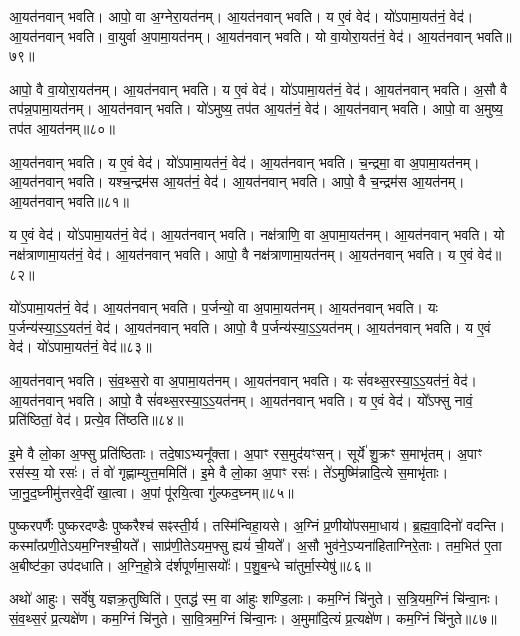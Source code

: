 आ॒यत॑नवान्‌ भवति। आपो॒ वा अ॒ग्नेरा॒यत॑नम्। 
आ॒यत॑नवान्‌ भवति। य ए॒वं वेद॑। 
यो॑ऽपामा॒यत॑नं॒ वेद॑। आ॒यत॑नवान्‌ भवति। 
वा॒युर्वा अ॒पामा॒यत॑नम्। आ॒यत॑नवान्‌ भवति। 
यो वा॒योरा॒यत॑नं॒ वेद॑। आ॒यत॑नवान्‌ भवति॥७९॥


आपो॒ वै वा॒योरा॒यत॑नम्। आ॒यत॑नवान्‌ भवति। 
य ए॒वं वेद॑। यो॑ऽपामा॒यत॑नं॒ वेद॑। 
आ॒यत॑नवान्‌ भवति। अ॒सौ वै तप॑न्न॒पा\-मा॒यत॑नम्। 
आ॒यत॑नवान्‌ भवति। यो॑ऽमुष्य॒ तप॑त आ॒यत॑नं॒ वेद॑। 
आ॒यत॑नवान्‌ भवति। आपो॒ वा अ॒मुष्य॒ तप॑त आ॒यत॑नम्॥८०॥


आ॒यत॑नवान्‌ भवति। य ए॒वं वेद॑। 
यो॑ऽपामा॒यत॑नं॒ वेद॑। आ॒यत॑नवान्‌ भवति। 
च॒न्द्रमा॒ वा अ॒पामा॒यत॑नम्। आ॒यत॑नवान्‌ भवति। 
यश्च॒न्द्रम॑स आ॒यत॑नं॒ वेद॑। आ॒यत॑नवान्‌ भवति। 
आपो॒ वै च॒न्द्रम॑स आ॒यत॑नम्। आ॒यत॑नवान्‌ भवति॥८१॥


य ए॒वं वेद॑। यो॑ऽपामा॒यत॑नं॒ वेद॑। 
आ॒यत॑नवान्‌ भवति। नक्ष॑त्राणि॒ वा अ॒पामा॒यत॑नम्। 
आ॒यत॑नवान्‌ भवति। यो नक्ष॑त्राणामा॒यत॑नं॒ वेद॑। 
आ॒यत॑नवान्‌ भवति। आपो॒ वै नक्ष॑त्राणामा॒यत॑नम्। 
आ॒यत॑नवान्‌ भवति। य ए॒वं वेद॑॥८२॥


यो॑ऽपामा॒यत॑नं॒ वेद॑। आ॒यत॑नवान्‌ भवति।
प॒र्जन्यो॒ वा अ॒पामा॒यत॑नम्। आ॒यत॑नवान्‌ भवति। 
यः प॒र्जन्य॑स्या॒ऽ॒ऽ॒यत॑नं॒ वेद॑। आ॒यत॑नवान्‌ भवति। 
आपो॒ वै प॒र्जन्य॑स्या॒ऽ॒ऽ॒यत॑नम्। आ॒यत॑नवान्‌ भवति। 
य ए॒वं वेद॑। यो॑ऽपामा॒यत॑नं॒ वेद॑॥८३॥


आ॒यत॑नवान्‌ भवति। सं॒व॒थ्स॒रो वा अ॒पामा॒यत॑नम्। 
आ॒यत॑नवान्‌ भवति। यः सं॑वथ्स॒रस्या॒ऽ॒ऽ॒यत॑नं॒ वेद॑। 
आ॒यत॑नवान्‌ भवति। आपो॒ वै सं॑वथ्स॒रस्या॒ऽ॒ऽ॒यत॑नम्। 
आ॒यत॑नवान्‌ भवति। य ए॒वं वेद॑। 
यो᳚ऽफ्सु नावं॒ प्रति॑ष्ठितां॒ वेद॑। प्रत्ये॒व ति॑ष्ठति॥८४॥


इ॒मे वै लो॒का अ॒फ्सु प्रति॑ष्ठिताः। तदे॒षाऽभ्यनू᳚क्ता। 
अ॒पाꣳ रस॒मुद॑यꣳसन्। सूर्ये॑ शु॒क्रꣳ स॒माभृ॑तम्। 
अ॒पाꣳ रस॑स्य॒ यो रसः॑। तं वो॑ गृह्णाम्युत्त॒ममिति॑। 
इ॒मे वै लो॒का अ॒पाꣳ रसः॑। ते॑ऽमुष्मि॑न्नादि॒त्ये स॒माभृ॑ताः। 
जा॒नु॒द॒घ्नीमु॑त्तर\-वे॒दीं खा॒त्वा। अ॒पां पू॑रयि॒त्वा गु॑ल्फद॒घ्नम्॥८५॥


पुष्करपर्णैः पुष्करदण्डैः पुष्करैश्च॑ सꣴस्ती॒र्य। तस्मि॑न्वि\-हा॒यसे। 
अ॒ग्निं प्र॒णीयो॑पसमा॒धाय॑। ब्र॒ह्म॒वा॒दिनो॑ वदन्ति। 
कस्मा᳚त्प्रणी॒ते\-ऽयम॒ग्निश्ची॒यते᳚। साप्र॑णी॒तेऽयम॒फ्सु ह्ययं॑ ची॒यते᳚। 
अ॒सौ भुव॑ने॒ऽप्यना॑हिताग्निरे॒ताः। तम॒भित॑ ए॒ता अ॒बीष्ट॑का॒ उप॑दधाति। 
अ॒ग्नि॒हो॒त्रे द॑र्शपूर्णमा॒सयोः᳚। प॒शु॒ब॒न्धे चा॑तुर्मा॒स्येषु॑॥८६॥


अथो॑ आहुः। सर्वे॑षु यज्ञक्र॒तुष्विति॑। 
ए॒तद्ध॑ स्म॒ वा आ॑हुः शण्डि॒लाः। कम॒ग्निं चि॑नुते। 
स॒त्रि॒यम॒ग्निं चि॑न्वा॒नः। सं॒व॒थ्स॒रं प्र॒त्यक्षे॑ण। 
कम॒ग्निं चि॑नुते। सा॒वि॒त्रम॒ग्निं चि॑न्वा॒नः। 
अ॒मुमा॑दि॒त्यं प्र॒त्यक्षे॑ण। कम॒ग्निं चि॑नुते॥८७॥


